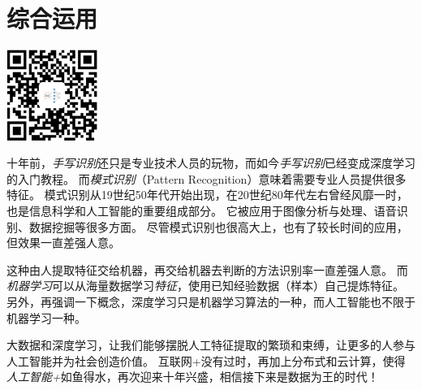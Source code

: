 \part{综合运用}
\label{part:ai_exercise}

\newpage

\begin{center}{\includegraphics[width=3cm]{barcode.png}}\end{center}\par

十年前，\emph{手写识别}还只是专业技术人员的玩物，而如今\emph{手写识别}已经变成深度学习的入门教程。
而\emph{模式识别}（Pattern Recognition）意味着需要专业人员提供很多特征。
模式识别从19世纪50年代开始出现，在20世纪80年代左右曾经风靡一时，也是信息科学和人工智能的重要组成部分。
它被应用于图像分析与处理、语音识别、数据挖掘等很多方面。
尽管模式识别也很高大上，也有了较长时间的应用，但效果一直差强人意。

这种由人提取特征交给机器，再交给机器去判断的方法识别率一直差强人意。
而\emph{机器学习}可以从海量数据学习\emph{特征}，使用已知经验数据（样本）自己提炼特征。
另外，再强调一下概念，深度学习只是机器学习算法的一种，而人工智能也不限于机器学习一种。

\begin{figure}[!htb] \centering
{}
\end{figure}

大数据和深度学习，让我们能够摆脱人工特征提取的繁琐和束缚，让更多的人参与人工智能并为社会创造价值。
互联网+没有过时，再加上分布式和云计算，使得\emph{人工智能+}如鱼得水，再次迎来十年兴盛，相信接下来是数据为王的时代！



